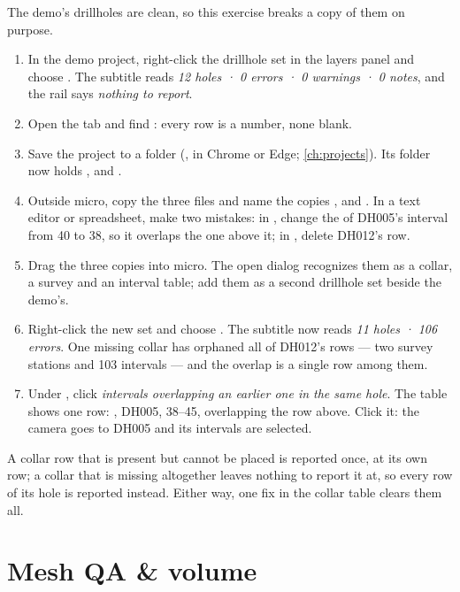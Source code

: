 \begin{tryit}
The demo's drillholes are clean, so this exercise breaks a copy of them on purpose.
\begin{enumerate}
\item In the demo project, right-click the drillhole set in the layers panel and choose . The subtitle reads \emph{12 holes · 0 errors · 0 warnings · 0 notes}, and the rail says \emph{nothing to report}.
\item Open the  tab and find : every row is a number, none blank.
\item Save the project to a folder (, in Chrome or Edge; \cref{ch:projects}). Its  folder now holds ,  and .
\item Outside micro, copy the three files and name the copies ,  and . In a text editor or spreadsheet, make two mistakes: in , change the  of DH005's interval from 40 to 38, so it overlaps the one above it; in , delete DH012's row.
\item Drag the three copies into micro. The open dialog recognizes them as a collar, a survey and an interval table; add them as a second drillhole set beside the demo's.
\item Right-click the new set and choose . The subtitle now reads \emph{11 holes · 106 errors}. One missing collar has orphaned all of DH012's rows — two survey stations and 103 intervals — and the overlap is a single row among them.
\item Under , click \emph{intervals overlapping an earlier one in the same hole}. The table shows one row: , DH005, 38–45, overlapping the row above. Click it: the camera goes to DH005 and its intervals are selected.
\end{enumerate}
A collar row that is present but cannot be placed is reported once, at its own row; a collar that is missing altogether leaves nothing to report it at, so every row of its hole is reported instead. Either way, one fix in the collar table clears them all.
\end{tryit}

\section{Mesh QA \& volume}\label{sec:qa-mesh}

